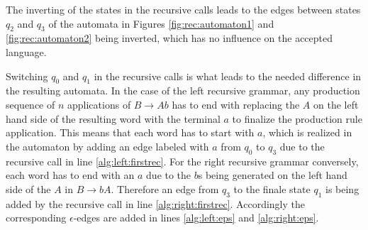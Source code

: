 The inverting of the states in the recursive calls leads to the edges between states $q_2$ and $q_3$ of the automata in Figures \ref{fig:rec:automaton1} and \ref{fig:rec:automaton2} being inverted, which has no influence on the accepted language. 

Switching $q_0$ and $q_1$ in the recursive calls is what leads to the needed difference in the resulting automata. In the case of the left recursive grammar, any production sequence of $n$ applications of $B \rightarrow Ab$ has to end with replacing the $A$ on the left hand side of the resulting word with the terminal $a$ to finalize the production rule application. This means that each word has to start with $a$, which is realized in the automaton by adding an edge labeled with $a$ from $q_0$ to $q_3$ due to the recursive call in line \ref{alg:left:firstrec}. For the right recursive grammar conversely, each word has to end with an $a$ due to the $b$s being generated on the left hand side of the $A$ in $B \rightarrow bA$. Therefore an edge from $q_3$ to the finale state $q_1$ is being added by the recursive call in line \ref{alg:right:firstrec}.
Accordingly the corresponding $\epsilon$-edges are added in lines \ref{alg:left:eps} and \ref{alg:right:eps}.

